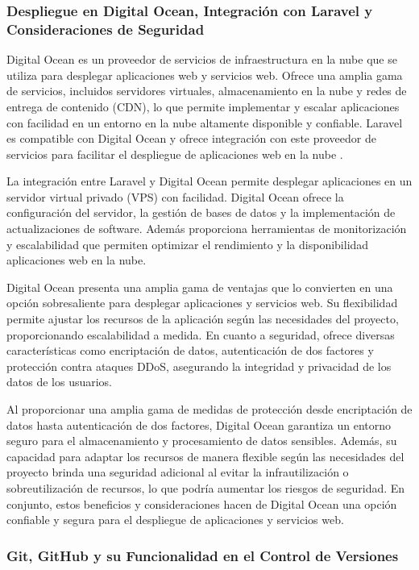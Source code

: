\subsubsection{Despliegue en Digital Ocean, Integración con Laravel y Consideraciones de Seguridad}

Digital Ocean es un proveedor de servicios de infraestructura en la nube que se utiliza para desplegar aplicaciones web y servicios web. Ofrece una amplia gama de servicios, incluidos servidores virtuales, almacenamiento en la nube y redes de entrega de contenido (CDN), lo que permite implementar y escalar aplicaciones con facilidad en un entorno en la nube altamente disponible y confiable. Laravel es compatible con Digital Ocean y ofrece integración con este proveedor de servicios para facilitar el despliegue de aplicaciones web en la nube \cite{digitalocean}.

La integración entre Laravel y Digital Ocean permite desplegar aplicaciones en un servidor virtual privado (VPS) con facilidad. Digital Ocean ofrece la configuración del servidor, la gestión de bases de datos y la implementación de actualizaciones de software. Además proporciona herramientas de monitorización y escalabilidad que permiten optimizar el rendimiento y la disponibilidad aplicaciones web en la nube.

Digital Ocean presenta una amplia gama de ventajas que lo convierten en una opción sobresaliente para desplegar aplicaciones y servicios web. Su flexibilidad permite ajustar los recursos de la aplicación según las necesidades del proyecto, proporcionando escalabilidad a medida. En cuanto a seguridad, ofrece diversas características como encriptación de datos, autenticación de dos factores y protección contra ataques DDoS, asegurando la integridad y privacidad de los datos de los usuarios.

Al proporcionar una amplia gama de medidas de protección desde encriptación de datos hasta autenticación de dos factores, Digital Ocean garantiza un entorno seguro para el almacenamiento y procesamiento de datos sensibles. Además, su capacidad para adaptar los recursos de manera flexible según las necesidades del proyecto brinda una seguridad adicional al evitar la infrautilización o sobreutilización de recursos, lo que podría aumentar los riesgos de seguridad. En conjunto, estos beneficios y consideraciones hacen de Digital Ocean una opción confiable y segura para el despliegue de aplicaciones y servicios web.

\subsubsection{Git, GitHub y su Funcionalidad en el Control de Versiones}

